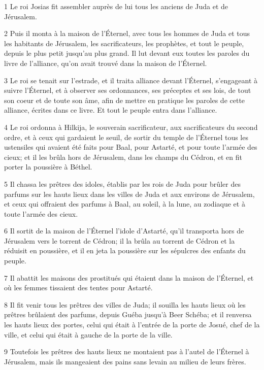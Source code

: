 \par 1 Le roi Josias fit assembler auprès de lui tous les anciens de Juda et de Jérusalem.
\par 2 Puis il monta à la maison de l'Éternel, avec tous les hommes de Juda et tous les habitants de Jérusalem, les sacrificateurs, les prophètes, et tout le peuple, depuis le plus petit jusqu'au plus grand. Il lut devant eux toutes les paroles du livre de l'alliance, qu'on avait trouvé dans la maison de l'Éternel.
\par 3 Le roi se tenait sur l'estrade, et il traita alliance devant l'Éternel, s'engageant à suivre l'Éternel, et à observer ses ordonnances, ses préceptes et ses lois, de tout son coeur et de toute son âme, afin de mettre en pratique les paroles de cette alliance, écrites dans ce livre. Et tout le peuple entra dans l'alliance.
\par 4 Le roi ordonna à Hilkija, le souverain sacrificateur, aux sacrificateurs du second ordre, et à ceux qui gardaient le seuil, de sortir du temple de l'Éternel tous les ustensiles qui avaient été faits pour Baal, pour Astarté, et pour toute l'armée des cieux; et il les brûla hors de Jérusalem, dans les champs du Cédron, et en fit porter la poussière à Béthel.
\par 5 Il chassa les prêtres des idoles, établis par les rois de Juda pour brûler des parfums sur les hauts lieux dans les villes de Juda et aux environs de Jérusalem, et ceux qui offraient des parfums à Baal, au soleil, à la lune, au zodiaque et à toute l'armée des cieux.
\par 6 Il sortit de la maison de l'Éternel l'idole d'Astarté, qu'il transporta hors de Jérusalem vers le torrent de Cédron; il la brûla au torrent de Cédron et la réduisit en poussière, et il en jeta la poussière sur les sépulcres des enfants du peuple.
\par 7 Il abattit les maisons des prostitués qui étaient dans la maison de l'Éternel, et où les femmes tissaient des tentes pour Astarté.
\par 8 Il fit venir tous les prêtres des villes de Juda; il souilla les hauts lieux où les prêtres brûlaient des parfums, depuis Guéba jusqu'à Beer Schéba; et il renversa les hauts lieux des portes, celui qui était à l'entrée de la porte de Josué, chef de la ville, et celui qui était à gauche de la porte de la ville.
\par 9 Toutefois les prêtres des hauts lieux ne montaient pas à l'autel de l'Éternel à Jérusalem, mais ils mangeaient des pains sans levain au milieu de leurs frères.
